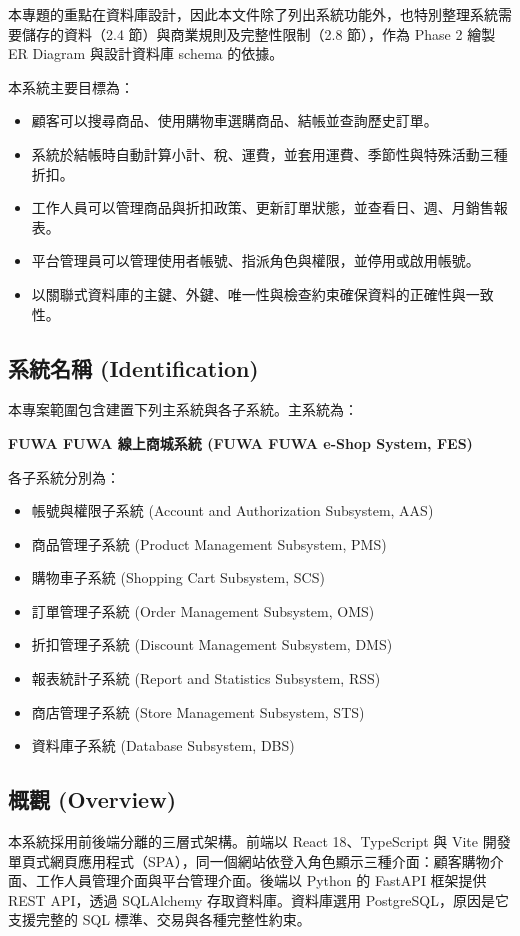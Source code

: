 \documentclass[12pt,a4paper]{article}
\begin{document}
本專題的重點在資料庫設計，因此本文件除了列出系統功能外，也特別整理系統需要儲存的資料（2.4 節）與商業規則及完整性限制（2.8 節），作為 Phase 2 繪製 ER Diagram 與設計資料庫 schema 的依據。

本系統主要目標為：
\begin{itemize}
  \item 顧客可以搜尋商品、使用購物車選購商品、結帳並查詢歷史訂單。
  \item 系統於結帳時自動計算小計、稅、運費，並套用運費、季節性與特殊活動三種折扣。
  \item 工作人員可以管理商品與折扣政策、更新訂單狀態，並查看日、週、月銷售報表。
  \item 平台管理員可以管理使用者帳號、指派角色與權限，並停用或啟用帳號。
  \item 以關聯式資料庫的主鍵、外鍵、唯一性與檢查約束確保資料的正確性與一致性。
\end{itemize}

\subsection{系統名稱 (Identification)}
本專案範圍包含建置下列主系統與各子系統。主系統為：

\textbf{FUWA FUWA 線上商城系統 (FUWA FUWA e-Shop System, FES)}

各子系統分別為：
\begin{itemize}
  \item 帳號與權限子系統 (Account and Authorization Subsystem, AAS)
  \item 商品管理子系統 (Product Management Subsystem, PMS)
  \item 購物車子系統 (Shopping Cart Subsystem, SCS)
  \item 訂單管理子系統 (Order Management Subsystem, OMS)
  \item 折扣管理子系統 (Discount Management Subsystem, DMS)
  \item 報表統計子系統 (Report and Statistics Subsystem, RSS)
  \item 商店管理子系統 (Store Management Subsystem, STS)
  \item 資料庫子系統 (Database Subsystem, DBS)
\end{itemize}

\subsection{概觀 (Overview)}
本系統採用前後端分離的三層式架構。前端以 React 18、TypeScript 與 Vite 開發單頁式網頁應用程式（SPA），同一個網站依登入角色顯示三種介面：顧客購物介面、工作人員管理介面與平台管理介面。後端以 Python 的 FastAPI 框架提供 REST API，透過 SQLAlchemy 存取資料庫。資料庫選用 PostgreSQL，原因是它支援完整的 SQL 標準、交易與各種完整性約束。
\end{document}

